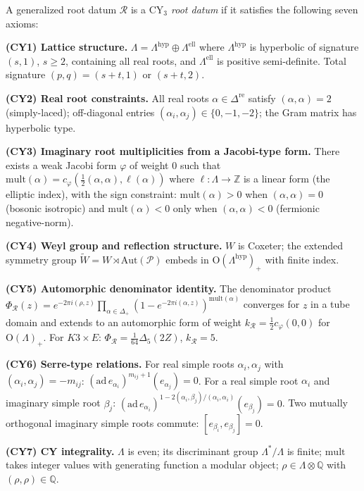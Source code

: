 \begin{definition}
\label{def:thy-grd-cy3-root-datum}
A generalized root datum $\mathcal{R}$ is a \emph{$\mathrm{CY}_3$ root datum}
if it satisfies the following seven axioms:

\medskip
\noindent\textbf{(CY1) Lattice structure.}
$\Lambda=\Lambda^{\mathrm{hyp}}\oplus\Lambda^{\mathrm{ell}}$ where
$\Lambda^{\mathrm{hyp}}$ is hyperbolic of signature $(s,1)$, $s\geq 2$,
containing all real roots, and $\Lambda^{\mathrm{ell}}$ is positive
semi-definite. Total signature $(p,q)=(s+t,1)$ or $(s+t,2)$.

\medskip
\noindent\textbf{(CY2) Real root constraints.}
All real roots $\alpha\in\Delta^{\mathrm{re}}$ satisfy $(\alpha,\alpha)=2$
(simply-laced); off-diagonal entries $(\alpha_i,\alpha_j)\in\{0,-1,-2\}$;
the Gram matrix has hyperbolic type.

\medskip
\noindent\textbf{(CY3) Imaginary root multiplicities from a Jacobi-type form.}
There exists a weak Jacobi form $\varphi$ of weight $0$ such that
$\mathrm{mult}(\alpha)=c_\varphi(\frac{1}{2}(\alpha,\alpha),\ell(\alpha))$
where $\ell\colon\Lambda\to\mathbb{Z}$ is a linear form (the elliptic index),
with the sign constraint: $\mathrm{mult}(\alpha)>0$ when $(\alpha,\alpha)=0$
(bosonic isotropic) and $\mathrm{mult}(\alpha)<0$ only when $(\alpha,\alpha)<0$
(fermionic negative-norm).

\medskip
\noindent\textbf{(CY4) Weyl group and reflection structure.}
$W$ is Coxeter; the extended symmetry group
$\widetilde{W}=W\rtimes\mathrm{Aut}(\mathcal{P})$ embeds in $\mathrm{O}(\Lambda^{\mathrm{hyp}})_+$
with finite index.

\medskip
\noindent\textbf{(CY5) Automorphic denominator identity.}
The denominator product
$\Phi_\mathcal{R}(z)=e^{-2\pi i(\rho,z)}\prod_{\alpha\in\Delta_+}
(1-e^{-2\pi i(\alpha,z)})^{\mathrm{mult}(\alpha)}$ converges for $z$ in a tube
domain and extends to an automorphic form of weight
$k_\mathcal{R}=\frac{1}{2}c_\varphi(0,0)$ for $\mathrm{O}(\Lambda)_+$.
For $K3\times E$: $\Phi_\mathcal{R}=\frac{1}{64}\Delta_5(2Z)$, $k_\mathcal{R}=5$.

\medskip
\noindent\textbf{(CY6) Serre-type relations.}
For real simple roots $\alpha_i,\alpha_j$ with $(\alpha_i,\alpha_j)=-m_{ij}$:
$(\mathrm{ad}\,e_{\alpha_i})^{m_{ij}+1}(e_{\alpha_j})=0$. For a real
simple root $\alpha_i$ and imaginary simple root $\beta_j$:
$(\mathrm{ad}\,e_{\alpha_i})^{1-2(\alpha_i,\beta_j)/(\alpha_i,\alpha_i)}(e_{\beta_j})=0$.
Two mutually orthogonal imaginary simple roots commute: $[e_{\beta_i},e_{\beta_j}]=0$.

\medskip
\noindent\textbf{(CY7) CY integrality.}
$\Lambda$ is even; its discriminant group $\Lambda^*/\Lambda$ is finite;
$\mathrm{mult}$ takes integer values with generating function a modular object;
$\rho\in\Lambda\otimes\mathbb{Q}$ with $(\rho,\rho)\in\mathbb{Q}$.
\end{definition}

